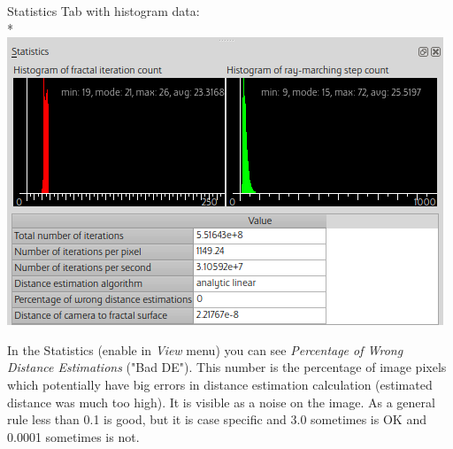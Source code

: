 Statistics Tab with histogram data:\\*
\includegraphics[width=0.7\linewidth]{img/manual/media/dock_statistics.png}

In the Statistics (enable in \emph{View} menu) you can see \emph{Percentage of
	Wrong Distance Estimations} ("Bad DE"). This number is the percentage of image
pixels which potentially have big errors in distance estimation calculation
(estimated distance was much too high). It is visible as a noise on the image.
As a general rule less than 0.1 is good, but it is case specific and 3.0
sometimes is OK and 0.0001 sometimes is not.
